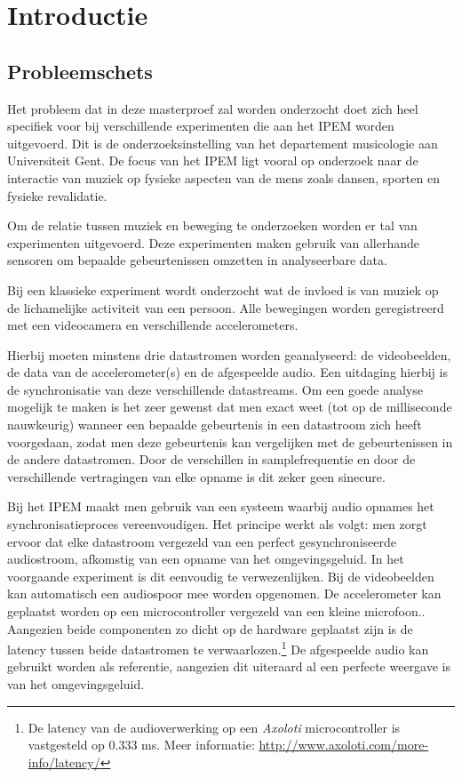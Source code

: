 \chapter{Introductie}

\section{Probleemschets}

Het probleem dat in deze masterproef zal worden onderzocht doet zich heel specifiek voor bij verschillende experimenten die aan het IPEM worden uitgevoerd. Dit is de onderzoeksinstelling van het departement musicologie aan Universiteit Gent. De focus van het IPEM ligt vooral op onderzoek naar de interactie van muziek op fysieke aspecten van de mens zoals dansen, sporten en fysieke revalidatie.\cite{ipem2016}

Om de relatie tussen muziek en beweging te onderzoeken worden er tal van experimenten uitgevoerd. Deze experimenten maken gebruik van allerhande sensoren om bepaalde gebeurtenissen omzetten in analyseerbare data. 

Bij een klassieke experiment wordt onderzocht wat de invloed is van muziek op de lichamelijke activiteit van een persoon. Alle bewegingen worden geregistreerd met een videocamera en verschillende accelerometers.

Hierbij moeten minstens drie datastromen worden geanalyseerd: de videobeelden, de data van de accelerometer(s) en de afgespeelde audio. Een  uitdaging hierbij is de synchronisatie van deze verschillende datastreams. Om een goede analyse mogelijk te maken is het zeer gewenst dat men exact weet (tot op de milliseconde nauwkeurig) wanneer een bepaalde gebeurtenis in een datastroom zich heeft voorgedaan, zodat men deze gebeurtenis kan vergelijken met de gebeurtenissen in de andere datastromen. Door de verschillen in samplefrequentie en door de verschillende vertragingen van elke opname is dit zeker geen sinecure. \cite{six2015multimodal}

Bij het IPEM maakt men gebruik van een systeem waarbij audio opnames het synchronisatieproces vereenvoudigen. Het principe werkt als volgt: men zorgt ervoor dat elke datastroom vergezeld van een perfect gesynchroniseerde audiostroom, afkomstig van een opname van het omgevingsgeluid. In het voorgaande experiment is dit eenvoudig te verwezenlijken. Bij de videobeelden kan automatisch een audiospoor mee worden opgenomen. De accelerometer kan geplaatst worden op een microcontroller vergezeld van een kleine microfoon.. Aangezien beide componenten zo dicht op de hardware geplaatst zijn is de latency tussen beide datastromen te verwaarlozen.\footnote{De latency van de audioverwerking op een \textit{Axoloti} microcontroller is vastgesteld op 0.333 ms. Meer informatie: \url{http://www.axoloti.com/more-info/latency/}} De afgespeelde audio kan gebruikt worden als referentie, aangezien dit uiteraard al een perfecte weergave is van het omgevingsgeluid. 

